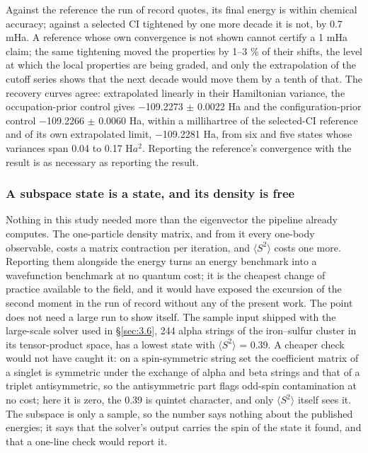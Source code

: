 \documentclass[11pt]{article}
\begin{document}
Against the reference the run of record quotes, its final energy is within chemical accuracy; against a selected CI tightened by one more decade it is not, by 0.7 mHa. A reference whose own convergence is not shown cannot certify a 1 mHa claim; the same tightening moved the properties by 1--3 \% of their shifts, the level at which the local properties are being graded, and only the extrapolation of the cutoff series shows that the next decade would move them by a tenth of that. The recovery curves agree: extrapolated linearly in their Hamiltonian variance, the occupation-prior control gives $-$109.2273 $\pm$ 0.0022 Ha and the configuration-prior control $-$109.2266 $\pm$ 0.0060 Ha, within a millihartree of the selected-CI reference and of its own extrapolated limit, $-$109.2281 Ha, from six and five states whose variances span 0.04 to 0.17 H$a^{2}$. Reporting the reference's convergence with the result is as necessary as reporting the result.

\subsubsection{A subspace state is a state, and its density is free}\label{sec:3.7.5}


Nothing in this study needed more than the eigenvector the pipeline already computes. The one-particle density matrix, and from it every one-body observable, costs a matrix contraction per iteration, and $\langle S^{2}\rangle$ costs one more. Reporting them alongside the energy turns an energy benchmark into a wavefunction benchmark at no quantum cost; it is the cheapest change of practice available to the field, and it would have exposed the excursion of the second moment in the run of record without any of the present work. The point does not need a large run to show itself. The sample input shipped with the large-scale solver used in \S\ref{sec:3.6}, 244 alpha strings of the iron--sulfur cluster in its tensor-product space, has a lowest state with $\langle S^{2}\rangle$ = 0.39. A cheaper check would not have caught it: on a spin-symmetric string set the coefficient matrix of a singlet is symmetric under the exchange of alpha and beta strings and that of a triplet antisymmetric, so the antisymmetric part flags odd-spin contamination at no cost; here it is zero, the 0.39 is quintet character, and only $\langle S^{2}\rangle$ itself sees it. The subspace is only a sample, so the number says nothing about the published energies; it says that the solver's output carries the spin of the state it found, and that a one-line check would report it.
\end{document}
